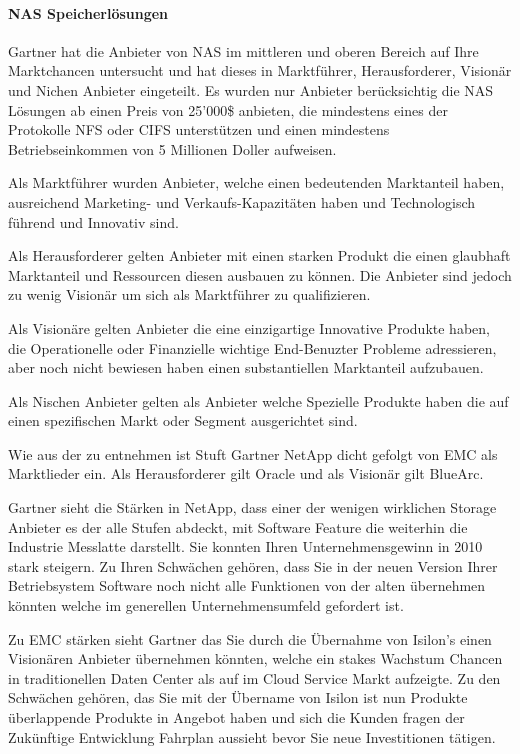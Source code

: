 \paragraph{NAS Speicherlösungen}
Gartner hat die Anbieter von NAS im mittleren und oberen Bereich auf Ihre Marktchancen untersucht und hat dieses in Marktführer, Herausforderer, Visionär und Nichen Anbieter eingeteilt. Es wurden nur Anbieter berücksichtig die NAS Lösungen ab einen Preis von 25'000\$ anbieten, die mindestens eines der Protokolle NFS oder CIFS unterstützen und einen mindestens Betriebseinkommen von 5 Millionen Doller aufweisen. 

Als Marktführer wurden Anbieter, welche einen bedeutenden Marktanteil haben, ausreichend Marketing- und Verkaufs-Kapazitäten haben und Technologisch führend und Innovativ sind.

Als Herausforderer gelten Anbieter mit einen starken Produkt die einen glaubhaft Marktanteil und Ressourcen diesen ausbauen zu können. Die Anbieter sind jedoch zu wenig Visionär um sich als Marktführer zu qualifizieren.

Als Visionäre gelten Anbieter die eine einzigartige Innovative Produkte haben, die Operationelle oder Finanzielle wichtige End-Benuzter Probleme adressieren, aber noch nicht bewiesen haben einen substantiellen Marktanteil aufzubauen.

Als Nischen Anbieter gelten als Anbieter welche Spezielle Produkte haben die auf einen spezifischen Markt oder Segment ausgerichtet sind.

Wie aus der  zu entnehmen ist Stuft Gartner NetApp dicht gefolgt von EMC als Marktlieder ein. Als Herausforderer gilt Oracle und als Visionär gilt BlueArc.

Gartner sieht die Stärken in NetApp, dass einer der wenigen wirklichen Storage Anbieter es der alle Stufen abdeckt, mit Software Feature die weiterhin die Industrie Messlatte darstellt. Sie konnten Ihren Unternehmensgewinn in 2010 stark steigern. Zu Ihren Schwächen gehören, dass Sie in der neuen Version Ihrer Betriebsystem Software noch nicht alle Funktionen von der alten übernehmen könnten welche im generellen Unternehmensumfeld gefordert ist.

Zu EMC stärken sieht Gartner das Sie durch die Übernahme von Isilon's einen Visionären Anbieter übernehmen könnten, welche ein stakes Wachstum Chancen in traditionellen Daten Center als auf im Cloud Service Markt aufzeigte. Zu den Schwächen gehören, das Sie mit der Übername von Isilon ist nun Produkte überlappende Produkte in Angebot haben und sich die Kunden fragen der Zukünftige Entwicklung Fahrplan aussieht bevor Sie neue Investitionen tätigen.

